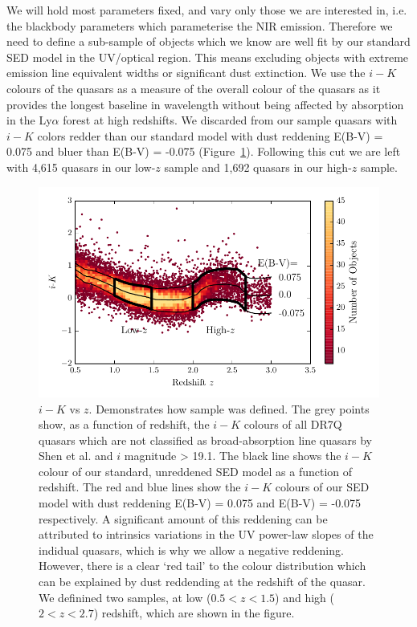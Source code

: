 We will hold most parameters fixed, and vary only those we are interested in, i.e. the blackbody parameters which parameterise the NIR emission. 
Therefore we need to define a sub-sample of objects which we know are well fit by our standard SED model in the UV/optical region. 
This means excluding objects with extreme emission line equivalent widths or significant dust extinction.
We use the $i-K$ colours of the quasars as a measure of the overall colour of the quasars as it provides the longest baseline in wavelength without being affected by absorption in the Ly$\alpha$ forest at high redshifts. 
We discarded from our sample quasars with $i - K$ colors redder than our standard model with dust reddening E(B-V) = 0.075 and bluer than E(B-V) = -0.075 (Figure~\ref{fig:ikzplot}). 
Following this cut we are left with 4,615 quasars in our low-$z$ sample and 1,692 quasars in our high-$z$ sample. 

\begin{figure}
  \centering
  \includegraphics[width=\columnwidth]{figures/chapter05/ik_versus_z_low_ext.pdf}
  \caption{$i-K$ vs $z$. Demonstrates how sample was defined. The grey points show, as a function of redshift, the $i-K$ colours of all DR7Q quasars which are not classified as broad-absorption line quasars by Shen et al. and $i$ magnitude > 19.1. The black line shows the $i-K$ colour of our standard, unreddened SED model as a function of redshift. The red and blue lines show the $i-K$ colours of our SED model with dust reddening E(B-V) = 0.075 and E(B-V) = -0.075 respectively. A significant amount of this reddening can be attributed to intrinsics variations in the UV power-law slopes of the indidual quasars, which is why we allow a negative reddening. However, there is a clear `red tail' to the colour distribution which can be explained by dust reddending at the redshift of the quasar. We definined two samples, at low ($0.5 < z < 1.5$) and high ($2 < z < 2.7$) redshift, which are shown in the figure.}
  \label{fig:ikzplot}
\end{figure}

